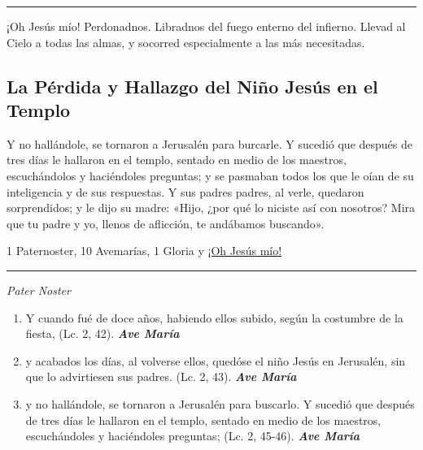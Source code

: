 \documentclass[a4paper,11pt, oneside]{report}
\begin{document}
{{    \begin{center}\rule{1\linewidth}{\linethickness}\end{center}
 
    \medskip
    \hypertarget{finalPresentacion}{¡Oh Jesús mío! Perdonadnos. Libradnos del fuego enterno del infierno. Llevad al Cielo a todas las almas, y socorred especialmente a las más 
    necesitadas.}
  }    
              
  \subsection*{La Pérdida y Hallazgo del Niño Jesús en el Templo}
  {

    Y no hallándole, se tornaron a Jerusalén para burcarle. Y sucedió que después de tres días le hallaron en el templo, sentado en medio de los maestros,
    escuchándolos y haciéndoles preguntas; y se pasmaban todos los que le oían de su inteligencia y de sus respuestas. Y sus padres padres, al verle, quedaron  
    sorprendidos; y le dijo su madre: «Hijo, ¿por qué lo niciste así con nosotros? Mira que tu padre y yo, llenos de aflicción, te andábamos buscando».
    
    \medskip

    1 Paternoster, 10 Avemarías, 1 Gloria y \hyperlink{finalPerdida}{¡Oh Jesús mío!}

    \medskip

    \begin{center}\rule{1\linewidth}{\linethickness}\end{center}

    \medskip
    \textit{Pater Noster}

    \begin{enumerate}

      \item Y cuando fué de doce años, habiendo ellos subido, según la costumbre de la fiesta, (Lc. 2, 42). \textbf{\textit{Ave María}}

      \item y acabados los días, al volverse ellos, quedóse el niño Jesús en Jerusalén, sin que lo advirtiesen sus padres. (Lc. 2, 43). \textbf{\textit{Ave María}}

      \item y no hallándole, se tornaron a Jerusalén para buscarlo. Y sucedió que después de tres días le hallaron en el templo,
      sentado en medio de los maestros, escuchándoles y haciéndoles preguntas; (Lc. 2, 45-46). \textbf{\textit{Ave María}}


\end{enumerate}}}
\end{document}
